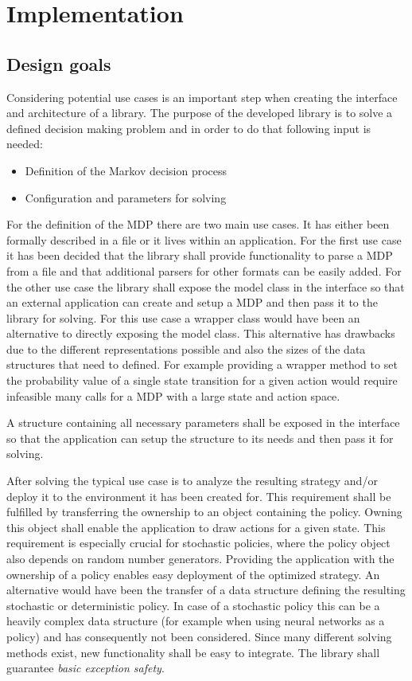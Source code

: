 \chapter{Implementation}

\section{Design goals}
\label{goals}

Considering potential use cases is an important step when creating the interface and architecture of a library. The purpose of the developed library is to solve a defined decision making problem and in order to do that following input is needed:

\begin{itemize}
	\item Definition of the Markov decision process
	\item Configuration and parameters for solving
\end{itemize}

For the definition of the MDP there are two main use cases. It has either been formally described in a file or it lives within an application. For the first use case it has been decided that the library shall provide functionality to parse a MDP from a file and that additional parsers for other formats can be easily added. For the other use case the library shall expose the model class in the interface so that an external application can create and setup a MDP and then pass it to the library for solving. For this use case a wrapper class would have been an alternative to directly exposing the model class. This alternative has drawbacks due to the different representations possible and also the sizes of the data structures that need to defined. For example providing a wrapper method to set the probability value of a single state transition for a given action would require infeasible many calls for a MDP with a large state and action space. 

A structure containing all necessary parameters shall be exposed in the interface so that the application can setup the structure to its needs and then pass it for solving. 

After solving the typical use case is to analyze the resulting strategy and/or deploy it to the environment it has been created for. This requirement shall be fulfilled by transferring the ownership to an object containing the policy. Owning this object shall enable the application to draw actions for a given state. This requirement is especially crucial for stochastic policies, where the policy object also depends on random number generators. Providing the application with the ownership of a policy enables easy deployment of the optimized strategy. An alternative would have been the transfer of a data structure defining the resulting stochastic or deterministic policy. In case of a stochastic policy this can be a heavily complex data structure (for example when using neural networks as a policy) and has consequently not been considered. 
Since many different solving methods exist, new functionality shall be easy to integrate.
The library shall guarantee \emph{basic exception safety}. 

